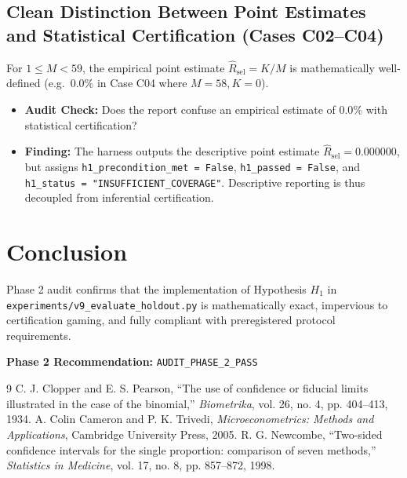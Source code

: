 \documentclass[10pt,a4paper]{article}
\begin{document}
\subsection{Clean Distinction Between Point Estimates and Statistical Certification (Cases C02--C04)}
For $1 \le M < 59$, the empirical point estimate $\hat{R}_{\mathrm{sel}} = K / M$ is mathematically well-defined (e.g.\ $0.0\%$ in Case C04 where $M=58, K=0$).
\begin{itemize}
    \item \textbf{Audit Check:} Does the report confuse an empirical estimate of $0.0\%$ with statistical certification?
    \item \textbf{Finding:} The harness outputs the descriptive point estimate $\hat{R}_{\mathrm{sel}} = 0.000000$, but assigns \texttt{h1\_precondition\_met = False}, \texttt{h1\_passed = False}, and \texttt{h1\_status = "INSUFFICIENT\_COVERAGE"}. Descriptive reporting is thus decoupled from inferential certification.
\end{itemize}

\section{Conclusion}
Phase 2 audit confirms that the implementation of Hypothesis $H_1$ in \texttt{experiments/v9\_evaluate\_holdout.py} is mathematically exact, impervious to certification gaming, and fully compliant with preregistered protocol requirements.

\noindent \textbf{Phase 2 Recommendation:} \texttt{AUDIT\_PHASE\_2\_PASS}

\begin{thebibliography}{9}
 C. J. Clopper and E. S. Pearson, ``The use of confidence or fiducial limits illustrated in the case of the binomial,'' \textit{Biometrika}, vol. 26, no. 4, pp. 404--413, 1934.
 A. Colin Cameron and P. K. Trivedi, \textit{Microeconometrics: Methods and Applications}, Cambridge University Press, 2005.
 R. G. Newcombe, ``Two-sided confidence intervals for the single proportion: comparison of seven methods,'' \textit{Statistics in Medicine}, vol. 17, no. 8, pp. 857--872, 1998.
\end{thebibliography}
\end{document}
